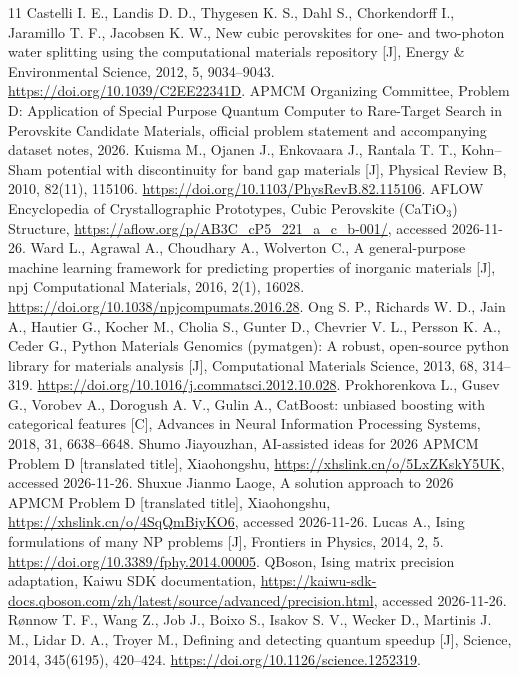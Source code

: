 \clearpage
\begin{thebibliography}{11}
 Castelli I. E., Landis D. D., Thygesen K. S., Dahl S., Chorkendorff I., Jaramillo T. F., Jacobsen K. W., New cubic perovskites for one- and two-photon water splitting using the computational materials repository [J], Energy \& Environmental Science, 2012, 5, 9034--9043. \url{https://doi.org/10.1039/C2EE22341D}.
 APMCM Organizing Committee, Problem D: Application of Special Purpose Quantum Computer to Rare-Target Search in Perovskite Candidate Materials, official problem statement and accompanying dataset notes, 2026.
 Kuisma M., Ojanen J., Enkovaara J., Rantala T. T., Kohn--Sham potential with discontinuity for band gap materials [J], Physical Review B, 2010, 82(11), 115106. \url{https://doi.org/10.1103/PhysRevB.82.115106}.
 AFLOW Encyclopedia of Crystallographic Prototypes, Cubic Perovskite (CaTiO$_3$) Structure, \url{https://aflow.org/p/AB3C_cP5_221_a_c_b-001/}, accessed 2026-11-26.
 Ward L., Agrawal A., Choudhary A., Wolverton C., A general-purpose machine learning framework for predicting properties of inorganic materials [J], npj Computational Materials, 2016, 2(1), 16028. \url{https://doi.org/10.1038/npjcompumats.2016.28}.
 Ong S. P., Richards W. D., Jain A., Hautier G., Kocher M., Cholia S., Gunter D., Chevrier V. L., Persson K. A., Ceder G., Python Materials Genomics (pymatgen): A robust, open-source python library for materials analysis [J], Computational Materials Science, 2013, 68, 314--319. \url{https://doi.org/10.1016/j.commatsci.2012.10.028}.
 Prokhorenkova L., Gusev G., Vorobev A., Dorogush A. V., Gulin A., CatBoost: unbiased boosting with categorical features [C], Advances in Neural Information Processing Systems, 2018, 31, 6638--6648.
 Shumo Jiayouzhan, AI-assisted ideas for 2026 APMCM Problem D [translated title], Xiaohongshu, \url{https://xhslink.cn/o/5LxZKskY5UK}, accessed 2026-11-26.
 Shuxue Jianmo Laoge, A solution approach to 2026 APMCM Problem D [translated title], Xiaohongshu, \url{https://xhslink.cn/o/4SqQmBiyKO6}, accessed 2026-11-26.
 Lucas A., Ising formulations of many NP problems [J], Frontiers in Physics, 2014, 2, 5. \url{https://doi.org/10.3389/fphy.2014.00005}.
 QBoson, Ising matrix precision adaptation, Kaiwu SDK documentation, \url{https://kaiwu-sdk-docs.qboson.com/zh/latest/source/advanced/precision.html}, accessed 2026-11-26.
 R{\o}nnow T. F., Wang Z., Job J., Boixo S., Isakov S. V., Wecker D., Martinis J. M., Lidar D. A., Troyer M., Defining and detecting quantum speedup [J], Science, 2014, 345(6195), 420--424. \url{https://doi.org/10.1126/science.1252319}.
\end{thebibliography}

